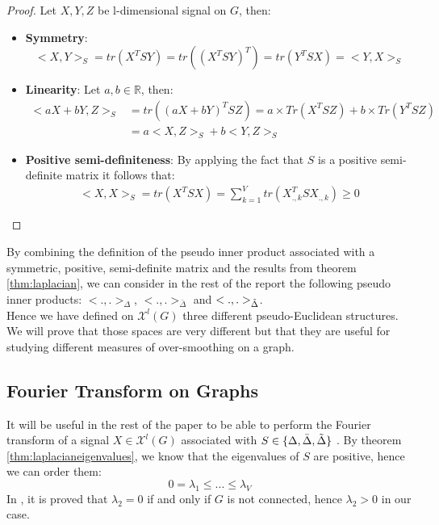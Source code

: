 \documentclass[12pt]{article}
\begin{document}
\begin{proof}
    Let $X,Y,Z$ be l-dimensional signal on $G$, then:
    \begin{itemize}
        \item \textbf{Symmetry}: $$<X,Y>_{S} = tr(X^T S Y) = tr((X^T S Y)^T) = tr(Y^T S X) = <Y,X>_{S}$$

        \item \textbf{Linearity}: Let $a,b \in \mathbb{R}$, then:
        \begin{align*}
            <aX+bY,Z>_{S} &= tr((aX+bY)^T S Z) = a\times Tr(X^T S Z) + b \times Tr(Y^T S Z) \\
            &=a<X,Z>_{S} +b<Y,Z>_{S}
        \end{align*}

        \item \textbf{Positive semi-definiteness}: 
        By applying the fact that $S$ is a positive semi-definite matrix it follows that:
        \begin{align*}
            <X,X>_{S} = tr(X^T S X) = \sum_{k=1}^V tr(X_{.,k}^T S X_{.,k}) \geq 0
        \end{align*}
    \end{itemize}
\end{proof}

By combining the definition of the pseudo inner product associated with a symmetric, positive, semi-definite matrix and the results from theorem \ref{thm:laplacian}, we can consider in the rest of the report the following pseudo inner products: $<.,.>_{\Delta}$, $<.,.>_{\bar{\Delta}}$ and $<.,.>_{\Tilde{\Delta}}$.\\

Hence we have defined on $\mathcal{X}^l(G)$ three different pseudo-Euclidean structures. We will prove that those spaces are very different but that they are useful for studying different measures of over-smoothing on a graph.


\subsection{Fourier Transform on Graphs}

It will be useful in the rest of the paper to be able to perform the Fourier transform of a signal $X \in \mathcal{X}^l(G)$ associated with $S \in \{\Delta, \bar{\Delta}, \Tilde{\Delta}\}$ . By theorem \ref{thm:laplacianeigenvalues}, we know that the eigenvalues of $S$ are positive, hence we can order them:
$$0= \lambda_1 \leq ... \leq \lambda_V $$
In , it is proved that $\lambda_2 = 0$ if and only if $G$ is not connected, hence $\lambda_2 > 0$ in our case.\\
\end{document}
